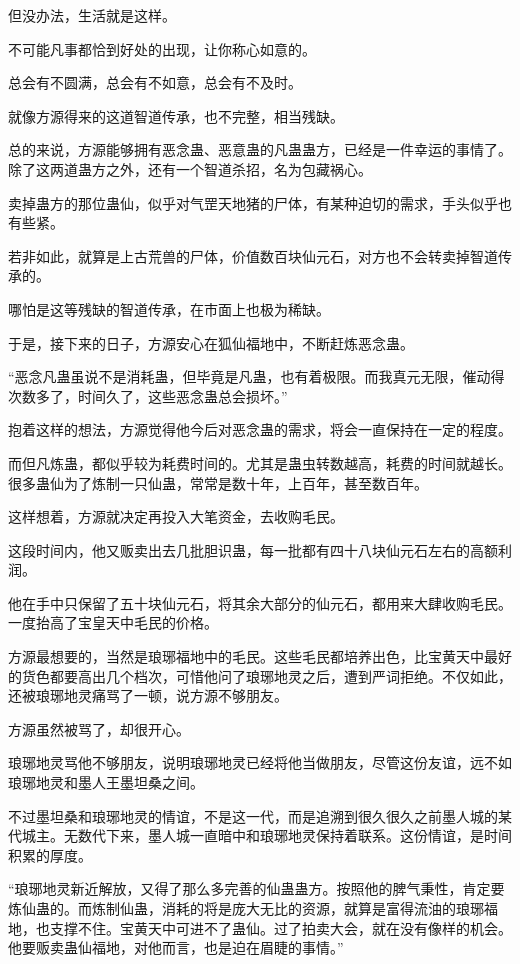 \begin{this_body}
但没办法，生活就是这样。

不可能凡事都恰到好处的出现，让你称心如意的。

总会有不圆满，总会有不如意，总会有不及时。

就像方源得来的这道智道传承，也不完整，相当残缺。

总的来说，方源能够拥有恶念蛊、恶意蛊的凡蛊蛊方，已经是一件幸运的事情了。除了这两道蛊方之外，还有一个智道杀招，名为包藏祸心。

卖掉蛊方的那位蛊仙，似乎对气罡天地猪的尸体，有某种迫切的需求，手头似乎也有些紧。

若非如此，就算是上古荒兽的尸体，价值数百块仙元石，对方也不会转卖掉智道传承的。

哪怕是这等残缺的智道传承，在市面上也极为稀缺。

于是，接下来的日子，方源安心在狐仙福地中，不断赶炼恶念蛊。

“恶念凡蛊虽说不是消耗蛊，但毕竟是凡蛊，也有着极限。而我真元无限，催动得次数多了，时间久了，这些恶念蛊总会损坏。”

抱着这样的想法，方源觉得他今后对恶念蛊的需求，将会一直保持在一定的程度。

而但凡炼蛊，都似乎较为耗费时间的。尤其是蛊虫转数越高，耗费的时间就越长。很多蛊仙为了炼制一只仙蛊，常常是数十年，上百年，甚至数百年。

这样想着，方源就决定再投入大笔资金，去收购毛民。

这段时间内，他又贩卖出去几批胆识蛊，每一批都有四十八块仙元石左右的高额利润。

他在手中只保留了五十块仙元石，将其余大部分的仙元石，都用来大肆收购毛民。一度抬高了宝皇天中毛民的价格。

方源最想要的，当然是琅琊福地中的毛民。这些毛民都培养出色，比宝黄天中最好的货色都要高出几个档次，可惜他问了琅琊地灵之后，遭到严词拒绝。不仅如此，还被琅琊地灵痛骂了一顿，说方源不够朋友。

方源虽然被骂了，却很开心。

琅琊地灵骂他不够朋友，说明琅琊地灵已经将他当做朋友，尽管这份友谊，远不如琅琊地灵和墨人王墨坦桑之间。

不过墨坦桑和琅琊地灵的情谊，不是这一代，而是追溯到很久很久之前墨人城的某代城主。无数代下来，墨人城一直暗中和琅琊地灵保持着联系。这份情谊，是时间积累的厚度。

“琅琊地灵新近解放，又得了那么多完善的仙蛊蛊方。按照他的脾气秉性，肯定要炼仙蛊的。而炼制仙蛊，消耗的将是庞大无比的资源，就算是富得流油的琅琊福地，也支撑不住。宝黄天中可进不了蛊仙。过了拍卖大会，就在没有像样的机会。他要贩卖蛊仙福地，对他而言，也是迫在眉睫的事情。”


\end{this_body}

